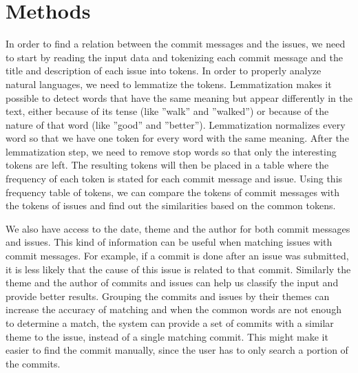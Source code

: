 \section{Methods}
\label{sec:methods}

In order to find a relation between the commit messages and the issues, we need to start by reading the input data and tokenizing each commit message and the title and description of each issue into tokens. In order to properly analyze natural languages, we need to lemmatize the tokens. Lemmatization makes it possible to detect words that have the same meaning but appear differently in the text, either because of its tense (like ''walk'' and ''walked'') or because of the nature of that word (like ''good'' and ''better''). Lemmatization normalizes every word so that we have one token for every word with the same meaning. After the lemmatization step, we need to remove stop words so that only the interesting tokens are left. The resulting tokens will then be placed in a table where the frequency of each token is stated for each commit message and issue. Using this frequency table of tokens, we can compare the tokens of commit messages with the tokens of issues and find out the similarities based on the common tokens.


We also have access to the date, theme and the author for both commit messages and issues. This kind of information can be useful when matching issues with commit messages. For example, if a commit is done after an issue was submitted, it is less likely that the cause of this issue is related to that commit. Similarly the theme and the author of commits and issues can help us classify the input and provide better results. Grouping the commits and issues by their themes can increase the accuracy of matching and when the common words are not enough to determine a match, the system can provide a set of commits with a similar theme to the issue, instead of a single matching commit. This might make it easier to find the commit manually, since the user has to only search a portion of the commits.
